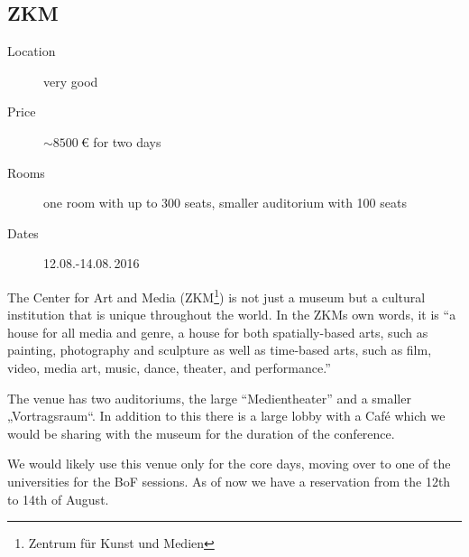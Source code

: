 
\vspace*{4.3cm}

\subsection{ZKM}
\label{zkm-venue}
\begin{description}
\item[Location] very good
\item[Price] $\sim\SI{8500}{\euro}$ for two days
\item[Rooms] one room with up to 300 seats, smaller auditorium with 100 seats
\item[Dates] 12.08.-14.08.\,2016
\end{description}

The Center for Art and Media (ZKM\footnote{Zentrum für Kunst und Medien}) is not
just a museum but a cultural institution that is unique throughout the world.
In the ZKMs own words, it is “a house for all media and genre, a house for both
spatially-based arts, such as painting, photography and sculpture as well as
time-based arts, such as film, video, media art, music, dance, theater, and performance.”

The venue has two auditoriums, the large “Medientheater” and a smaller
„Vortragsraum“. In addition to this there is a large lobby with a Café which we
would be sharing with the museum for the duration of the conference.

We would likely use this venue only for the core days, moving over to one of the
universities for the BoF sessions. As of now we have a reservation from the
12th to 14th of August.

